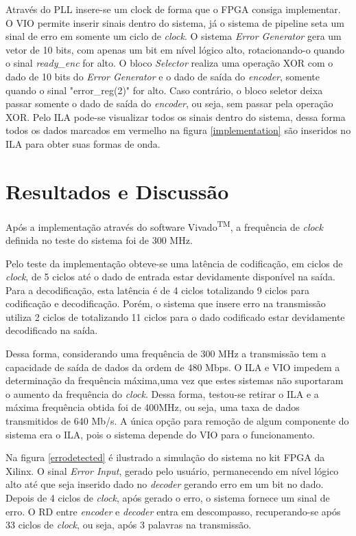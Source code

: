 \documentclass[11pt,twocolumn]{article}
\begin{document}
Através do PLL insere-se um clock de forma que o FPGA consiga implementar. O VIO permite inserir sinais dentro do sistema, já o sistema de pipeline seta um sinal de erro em somente um ciclo de \textit{clock}. O sistema \textit{Error Generator} gera um vetor de 10 bits, com apenas um bit em nível lógico alto, rotacionando-o quando o sinal \textit{ready\_enc} for alto. O bloco \textit{Selector} realiza uma operação XOR com o dado de 10 bits do \textit{Error Generator} e o dado de saída do \textit{encoder}, somente quando o sinal "error\_reg(2)" for alto. Caso contrário, o bloco seletor deixa passar somente o dado de saída do \textit{encoder}, ou seja, sem passar pela operação XOR. Pelo ILA pode-se visualizar todos os sinais dentro do sistema, dessa forma todos os dados marcados em vermelho na figura \ref{implementation} são inseridos no ILA para obter suas formas de onda.


\section{Resultados e Discussão}

Após a implementação através do software Vivado\textsuperscript{TM}, a frequência de \textit{clock} definida no teste do sistema foi de 300 MHz. 

Pelo teste da implementação obteve-se uma latência de codificação, em ciclos de \textit{clock}, de 5 ciclos até o dado de entrada estar devidamente disponível na saída. Para a decodificação, esta latência é de 4 ciclos totalizando 9 ciclos para codificação e decodificação. Porém, o sistema que insere erro na transmissão utiliza 2 ciclos de totalizando 11 ciclos para o dado codificado estar devidamente decodificado na saída.

Dessa forma, considerando uma frequência de 300 MHz a transmissão tem a capacidade de saída de dados da ordem de 480 Mbps. O ILA e VIO impedem a determinação da frequência máxima,uma vez que estes sistemas não suportaram o aumento da frequência do \textit{clock}. Dessa forma, testou-se retirar o ILA e a máxima frequência obtida foi de 400MHz, ou seja, uma taxa de dados transmitidos de 640 Mb/s. A única opção para remoção de algum componente do sistema era o ILA, pois o sistema depende do VIO para o funcionamento.

Na figura \ref{errodetected} é ilustrado a simulação do sistema no kit FPGA da Xilinx. O sinal \textit{Error Input}, gerado pelo usuário, permanecendo em nível lógico alto até que seja inserido dado no \textit{decoder} gerando erro em um bit no dado. Depois de 4 ciclos de \textit{clock}, após gerado o erro, o sistema fornece um sinal de erro. O RD entre \textit{encoder} e \textit{decoder} entra em descompasso, recuperando-se após 33 ciclos de \textit{clock}, ou seja, após 3 palavras na transmissão. 
\end{document}
